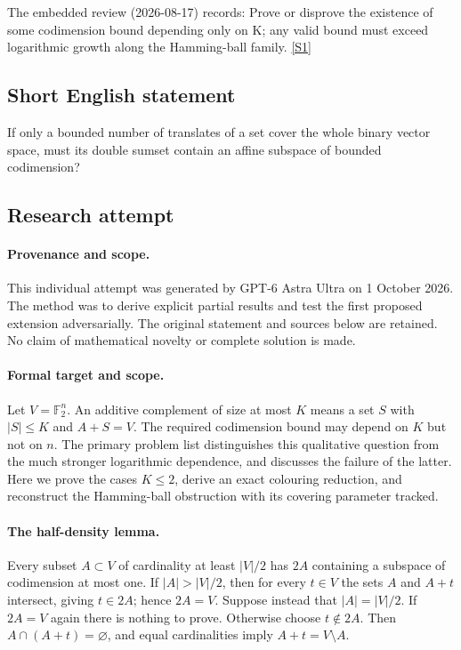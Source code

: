 \documentclass[11pt,a4paper]{article}
\newcommand{\F}{\mathbb{F}}
\newcommand{\sref}[2]{\hyperlink{source:#1:#2}{[S#2]}}
\begin{document}
The embedded review (2026-08-17) records: Prove or disprove the existence of some codimension bound depending only on K; any valid bound must exceed logarithmic growth along the Hamming-ball family. \sref{statement}{1}

\subsection{Short English statement}

If only a bounded number of translates of a set cover the whole binary vector space, must its double sumset contain an affine subspace of bounded codimension?

\subsection{Research attempt}

\paragraph{Provenance and scope.}
This individual attempt was generated by GPT-6 Astra Ultra on 1 October 2026. The method was to derive explicit partial results and test the first proposed extension adversarially. The original statement and sources below are retained. No claim of mathematical novelty or complete solution is made.

\paragraph{Formal target and scope.}
Let $V=\F_2^n$. An additive complement of size at most $K$ means a set $S$ with $|S|\leq K$ and $A+S=V$. The required codimension bound may depend on $K$ but not on $n$. The primary problem list distinguishes this qualitative question from the much stronger logarithmic dependence, and discusses the failure of the latter. Here we prove the cases $K\leq2$, derive an exact colouring reduction, and reconstruct the Hamming-ball obstruction with its covering parameter tracked.

\paragraph{The half-density lemma.}
Every subset $A\subset V$ of cardinality at least $|V|/2$ has $2A$ containing a subspace of codimension at most one. If $|A|>|V|/2$, then for every $t\in V$ the sets $A$ and $A+t$ intersect, giving $t\in2A$; hence $2A=V$. Suppose instead that $|A|=|V|/2$. If $2A=V$ again there is nothing to prove. Otherwise choose $t\notin2A$. Then $A\cap(A+t)=\varnothing$, and equal cardinalities imply $A+t=V\setminus A$.
\end{document}
